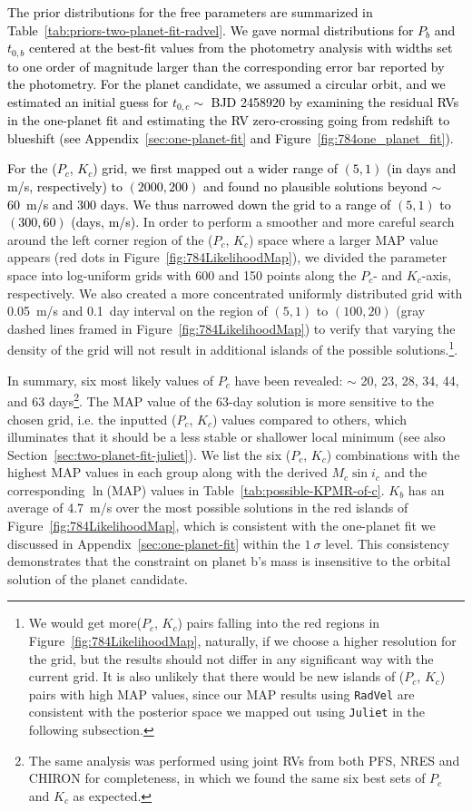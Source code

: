 \documentclass[twocolumn]{aastex631}
\newcommand{\rev}[1]{\textcolor{black}{#1}}
\newcommand{\code}[1]{{\texttt{#1}}}
\begin{document}
\rev{The prior distributions for the free parameters are summarized in Table~\ref{tab:priors-two-planet-fit-radvel}. We gave normal distributions for $P_b$ and $t_{0,b}$ centered at the best-fit values from the photometry analysis with widths set to one order of magnitude larger than the corresponding error bar reported by the photometry. For the planet candidate, we assumed a circular orbit, and we estimated an initial guess for $t_{0,c} \sim$ BJD 2458920 by examining the residual RVs in the one-planet fit and estimating the RV zero-crossing going from redshift to blueshift (see Appendix~\ref{sec:one-planet-fit} and Figure~\ref{fig:784one_planet_fit}).}

\rev{For the ($P_c$, $K_c$) grid, we first mapped out a wider range of $(5, 1)$ (in days and m/s, respectively) to $(2000, 200)$ and found no plausible solutions beyond $\sim$ 60~m/s and 300 days. We thus narrowed down the grid to a range of $(5, 1)$ to $(300, 60)$ (days, m/s).} In order to perform a smoother and more careful search around the left corner region of the ($P_c$, $K_c$) space where a larger MAP value appears (red dots in Figure~\ref{fig:784LikelihoodMap}),
we divided the parameter space into log-uniform grids with 600 and 150 points along the $P_c$- and $K_c$-axis, respectively. We also created a more concentrated uniformly distributed grid with 0.05~m/s and 0.1~day interval on the region of $(5, 1)$ to $(100, 20)$ (gray dashed lines framed in Figure~\ref{fig:784LikelihoodMap}) to verify that varying the density of the grid will not result in additional islands of the possible solutions.\footnote{We would get more($P_c$, $K_c$) pairs falling into the red regions in Figure~\ref{fig:784LikelihoodMap}, naturally, if we choose a higher resolution for the grid, but the results should not differ in any significant way with the current grid. It is also unlikely that there would be new islands of ($P_c$, $K_c$) pairs with high MAP values, since our MAP results using \code{RadVel} are consistent with the posterior space we mapped out using \code{Juliet} in the following subsection.}.

In summary, six most likely values of $P_c$ have been revealed: $\sim$ 20, 23, 28, 34, 44, and 63 days\footnote{The same analysis was performed using joint RVs from both PFS, NRES and CHIRON for completeness, in which we found the same six best sets of $P_c$ and $K_c$ as expected.}. The MAP value of the 63-day solution is more sensitive to the chosen grid, i.e. the inputted ($P_c$, $K_c$) values compared to others, which illuminates that it should be a less stable or shallower local minimum (see also Section~\ref{sec:two-planet-fit-juliet}). We list the six ($P_c$, $K_c$) combinations with the highest MAP values in each group along with the derived $M_c\sin{i_c}$ and the corresponding $\ln$(MAP) values in Table~\ref{tab:possible-KPMR-of-c}. $K_b$ has an average of 4.7~m/s over the most possible solutions in the red islands of Figure~\ref{fig:784LikelihoodMap}, which is consistent with the one-planet fit we discussed in Appendix~\ref{sec:one-planet-fit} within the $1~\sigma$ level. This consistency demonstrates that the constraint on planet b's mass is insensitive to the orbital solution of the planet candidate. 
\end{document}
